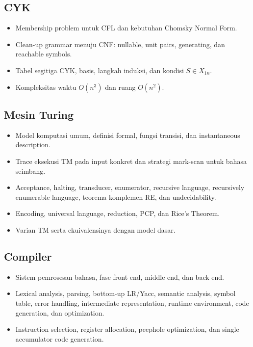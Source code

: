 \documentclass[11pt,a4paper]{article}
\begin{document}
\subsection{CYK}
\begin{itemize}
    \item Membership problem untuk CFL dan kebutuhan Chomsky Normal Form.
    \item Clean-up grammar menuju CNF: nullable, unit pairs, generating, dan reachable symbols.
    \item Tabel segitiga CYK, basis, langkah induksi, dan kondisi $S \in X_{1n}$.
    \item Kompleksitas waktu $O(n^3)$ dan ruang $O(n^2)$.
\end{itemize}

\subsection{Mesin Turing}
\begin{itemize}
    \item Model komputasi umum, definisi formal, fungsi transisi, dan instantaneous description.
    \item Trace eksekusi TM pada input konkret dan strategi mark-scan untuk bahasa seimbang.
    \item Acceptance, halting, transducer, enumerator, recursive language, recursively enumerable language, teorema komplemen RE, dan undecidability.
    \item Encoding, universal language, reduction, PCP, dan Rice's Theorem.
    \item Varian TM serta ekuivalensinya dengan model dasar.
\end{itemize}

\subsection{Compiler}
\begin{itemize}
    \item Sistem pemrosesan bahasa, fase front end, middle end, dan back end.
    \item Lexical analysis, parsing, bottom-up LR/Yacc, semantic analysis, symbol table, error handling, intermediate representation, runtime environment, code generation, dan optimization.
    \item Instruction selection, register allocation, peephole optimization, dan single accumulator code generation.
\end{itemize}
\end{document}
